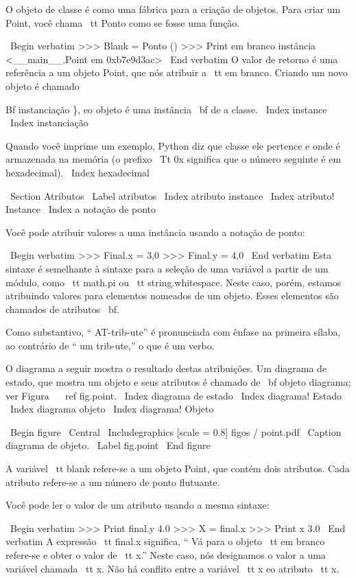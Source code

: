 \documentclass[10pt]{book}
\begin{document}
{{{{{{{{{{{O objeto de classe é como uma fábrica para a criação de objetos. Para criar um
Point, você chama {\ tt Ponto} como se fosse uma função.

\ Begin {verbatim}
>>> Blank = Ponto ()
>>> Print em branco
instância <__main__.Point em 0xb7e9d3ac>
\ End {verbatim}
%
O valor de retorno é uma referência a um objeto Point, que nós
atribuir a {\ tt em branco}.  
Criando um novo objeto é chamado
{Bf instanciação \}, eo objeto é uma instância {\ bf} de
a classe.
\ Index {instance}
\ Index {} instanciação

Quando você imprime um exemplo, Python diz que classe ele
pertence e onde é armazenada na memória (o prefixo
{\ Tt 0x} significa que o número seguinte é em hexadecimal).
\ Index {hexadecimal}


\ Section {Atributos}
\ Label {atributos}
\ Index {atributo instance}
\ Index {atributo! Instance}
\ Index {} a notação de ponto

Você pode atribuir valores a uma instância usando a notação de ponto:

\ Begin {verbatim}
>>> Final.x = 3,0
>>> Final.y = 4,0
\ End {verbatim}
%
Esta sintaxe é semelhante à sintaxe para a seleção de uma variável a partir de um
módulo, como {\ tt math.pi} ou {\ tt string.whitespace}. Neste caso,
porém, estamos atribuindo valores para elementos nomeados de um objeto.
Esses elementos são chamados de atributos {\ bf}.

Como substantivo, `` AT-trib-ute'' é pronunciada com ênfase na primeira
sílaba, ao contrário de `` um trib-ute,'' o que é um verbo.

O diagrama a seguir mostra o resultado destas atribuições.
Um diagrama de estado, que mostra um objeto e seus atributos é
chamado de {\ bf objeto diagrama}; ver Figura ~ \ ref {} fig.point.
\ Index {diagrama de estado}
\ Index {diagrama! Estado}
\ Index {diagrama objeto}
\ Index {diagrama! Objeto}

\ Begin {figure}
\ Central
{\ Includegraphics [scale = 0.8] {figos / point.pdf}}
\ Caption {diagrama de objeto.}
\ Label {} fig.point
\ End {figure}


A variável {\ tt blank} refere-se a um objeto Point, que
contém dois atributos. Cada atributo refere-se a um
número de ponto flutuante.

Você pode ler o valor de um atributo usando a mesma sintaxe:

\ Begin {verbatim}
>>> Print final.y
4.0
>>> X = final.x
>>> Print x
3.0
\ End {verbatim}
%
A expressão {\ tt final.x} significa, `` Vá para o objeto {\ tt em branco}
refere-se e obter o valor de {\ tt x}.'' Neste caso, nós designamos o
valor a uma variável chamada {\ tt x}. Não há conflito entre
a variável {\ tt x} eo atributo {\ tt x}.

}}}}}}}}}}}}
\end{document}
